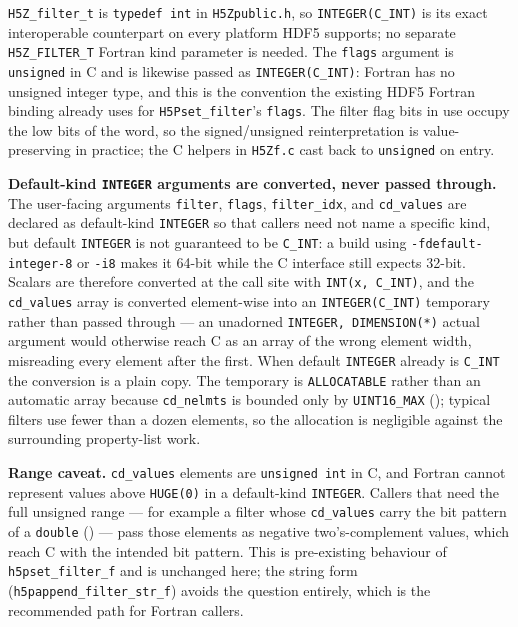 \documentclass[../RFC-HDFG-2026-001.tex]{subfiles}
\begin{document}
\texttt{H5Z\_filter\_t} is \texttt{typedef int} in \texttt{H5Zpublic.h}, so
\texttt{INTEGER(C\_INT)} is its exact interoperable counterpart on every
platform HDF5 supports; no separate \texttt{H5Z\_FILTER\_T} Fortran kind
parameter is needed.  The \texttt{flags} argument is \texttt{unsigned} in C and
is likewise passed as \texttt{INTEGER(C\_INT)}: Fortran has no unsigned integer
type, and this is the convention the existing HDF5 Fortran binding already uses
for \texttt{H5Pset\_filter}'s \texttt{flags}.  The filter flag bits in use
occupy the low bits of the word, so the signed/unsigned reinterpretation is
value-preserving in practice; the C helpers in \texttt{H5Zf.c} cast back to
\texttt{unsigned} on entry.

\textbf{Default-kind \texttt{INTEGER} arguments are converted, never passed
through.}  The user-facing arguments \texttt{filter}, \texttt{flags},
\texttt{filter\_idx}, and \texttt{cd\_values} are declared as default-kind
\texttt{INTEGER} so that callers need not name a specific kind, but default
\texttt{INTEGER} is not guaranteed to be \texttt{C\_INT}: a build using
\texttt{-fdefault-integer-8} or \texttt{-i8} makes it 64-bit while the C
interface still expects 32-bit.  Scalars are therefore converted at the call
site with \texttt{INT(x, C\_INT)}, and the \texttt{cd\_values} array is
converted element-wise into an \texttt{INTEGER(C\_INT)} temporary rather than
passed through --- an unadorned \texttt{INTEGER, DIMENSION(*)} actual argument
would otherwise reach C as an array of the wrong element width, misreading
every element after the first.  When default \texttt{INTEGER} already is
\texttt{C\_INT} the conversion is a plain copy.  The temporary is
\texttt{ALLOCATABLE} rather than an automatic array because \texttt{cd\_nelmts}
is bounded only by \texttt{UINT16\_MAX}
(); typical filters use fewer than a dozen
elements, so the allocation is negligible against the surrounding property-list
work.

\textbf{Range caveat.}  \texttt{cd\_values} elements are \texttt{unsigned int}
in C, and Fortran cannot represent values above \texttt{HUGE(0)} in a
default-kind \texttt{INTEGER}.  Callers that need the full unsigned range ---
for example a filter whose \texttt{cd\_values} carry the bit pattern of a
\texttt{double} () --- pass those
elements as negative two's-complement values, which reach C with the intended
bit pattern.  This is pre-existing behaviour of
\texttt{h5pset\_filter\_f} and is unchanged here; the string form
(\texttt{h5pappend\_filter\_str\_f}) avoids the question entirely, which is
the recommended path for Fortran callers.
\end{document}

